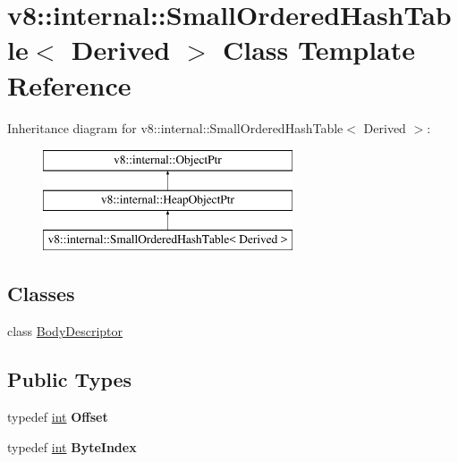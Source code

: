 \hypertarget{classv8_1_1internal_1_1SmallOrderedHashTable}{}\section{v8\+:\+:internal\+:\+:Small\+Ordered\+Hash\+Table$<$ Derived $>$ Class Template Reference}
\label{classv8_1_1internal_1_1SmallOrderedHashTable}
Inheritance diagram for v8\+:\+:internal\+:\+:Small\+Ordered\+Hash\+Table$<$ Derived $>$\+:\begin{figure}[H]
\begin{center}
\leavevmode
\includegraphics[height=3.000000cm]{classv8_1_1internal_1_1SmallOrderedHashTable}
\end{center}
\end{figure}
\subsection*{Classes}
\begin{DoxyCompactItemize}
\item 
class \mbox{\hyperlink{classv8_1_1internal_1_1SmallOrderedHashTable_1_1BodyDescriptor}{Body\+Descriptor}}
\end{DoxyCompactItemize}
\subsection*{Public Types}
\begin{DoxyCompactItemize}
\item 
\mbox{\label{classv8_1_1internal_1_1SmallOrderedHashTable_a491ef2e340296b12122eaa80aa03bf99}} 
typedef \mbox{\hyperlink{classint}{int}} {\bfseries Offset}
\item 
\mbox{\label{classv8_1_1internal_1_1SmallOrderedHashTable_aa5a72db951fc5aa38f6e99603149bad4}} 
typedef \mbox{\hyperlink{classint}{int}} {\bfseries Byte\+Index}
\end{DoxyCompactItemize}
